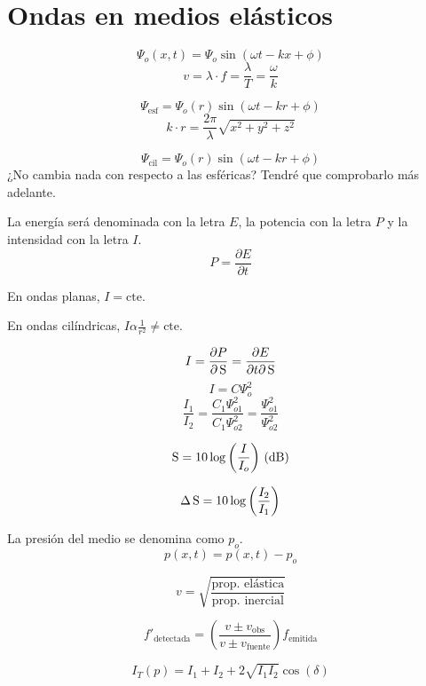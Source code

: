 \documentclass[a4paper]{book}
\begin{document}
\newpage
\section{Ondas en medios elásticos}

\begin{fleqn}
	\begin{multicols}{2}
		\[\Psi _o(x,t)=\Psi _o\sin{\left(\omega t-kx+\phi\right)}\]
		\[v=\lambda\cdot f=\frac{\lambda}{T} =\frac{\omega}{k}\]

		\[\Psi _{\text{esf}}=\Psi _o(r)\sin{\left(\omega t-kr+\phi\right)}\]
		\[k\cdot r=\frac{2\pi}{\lambda}\sqrt{x^2+y^2+z^2}\]

		\[\Psi _{\text{cil}}=\Psi _o(r)\sin{\left(\omega t-kr+\phi\right)}\]
		¿No cambia nada con respecto a las esféricas? Tendré que comprobarlo más adelante.

		\vspace{5pt}

		\noindent La energía será denominada con la letra $E$, la potencia con la letra $P$ y la intensidad con la letra $I$.
		\[P=\frac{\partial E}{\partial t}\]

		\noindent En ondas planas, $I = \text{cte.}$

		\noindent En ondas cilíndricas, $ I\alpha\frac{1}{r^2} \not = \text{cte.}$

		\[I = \pdv{P}{\S} = \pdv{E}{t\partial \S}\]
		\[I = C \Psi_o^2\]
		\[\frac{I_1}{I_2}=\frac{C_1 \Psi _{o1}^2}{C_1 \Psi _{o2}^2}=\frac{\Psi _{o1}^2}{\Psi _{o2}^2}\]

		\[\S = 10 \log{\left( \frac{I}{I_o} \right)} \ (\db )\]

		\[\Delta \S = 10 \log{\left( \frac{I_2}{I_1} \right) }\]

		\vspace{5pt}

		\noindent La presión del medio se denomina como $p_o$.
		\[p \left( x,t \right) = p(x,t) -p_o \]

		\[v=\sqrt{\frac{\text{prop. elástica}}{\text{prop. inercial}}}\]

		\[f'_{\text{detectada}}=\left( \frac{v\pm v_{\text{obs}}}{v\pm v_{\text{fuente}}} \right)f_{\text{emitida}}\]

		\[I_T(p)=I_1+I_2+2\sqrt{I_1I_2}\cos{\left(\delta \right)}\]


\end{multicols}
\end{fleqn}
\end{document}
